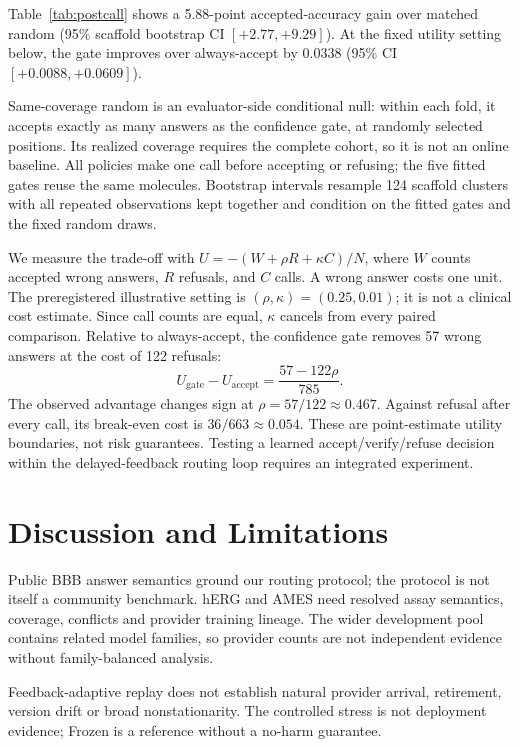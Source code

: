 \documentclass[sigconf,anonymous]{aamas}
\begin{document}
Table~\ref{tab:postcall} shows a 5.88-point accepted-accuracy gain over matched random (95\% scaffold bootstrap CI $[+2.77,+9.29]$). At the fixed utility setting below, the gate improves over always-accept by 0.0338 (95\% CI $[+0.0088,+0.0609]$).

Same-coverage random is an evaluator-side conditional null: within each fold, it accepts exactly as many answers as the confidence gate, at randomly selected positions. Its realized coverage requires the complete cohort, so it is not an online baseline. All policies make one call before accepting or refusing; the five fitted gates reuse the same molecules. Bootstrap intervals resample 124 scaffold clusters with all repeated observations kept together and condition on the fitted gates and the fixed random draws.

We measure the trade-off with $U=-(W+\rho R+\kappa C)/N$, where $W$ counts accepted wrong answers, $R$ refusals, and $C$ calls. A wrong answer costs one unit. The preregistered illustrative setting is $(\rho,\kappa)=(0.25,0.01)$; it is not a clinical cost estimate. Since call counts are equal, $\kappa$ cancels from every paired comparison. Relative to always-accept, the confidence gate removes 57 wrong answers at the cost of 122 refusals:
\begin{equation}
 U_{\mathrm{gate}}-U_{\mathrm{accept}}=\frac{57-122\rho}{785}.
\end{equation}
The observed advantage changes sign at $\rho=57/122\approx0.467$. Against refusal after every call, its break-even cost is $36/663\approx0.054$. These are point-estimate utility boundaries, not risk guarantees. Testing a learned accept/verify/refuse decision within the delayed-feedback routing loop requires an integrated experiment.

\section{Discussion and Limitations}
Public BBB answer semantics ground our routing protocol; the protocol is not itself a community benchmark. hERG and AMES need resolved assay semantics, coverage, conflicts and provider training lineage. The wider development pool contains related model families, so provider counts are not independent evidence without family-balanced analysis.

Feedback-adaptive replay does not establish natural provider arrival, retirement, version drift or broad nonstationarity. The controlled stress is not deployment evidence; Frozen is a reference without a no-harm guarantee.
\end{document}
